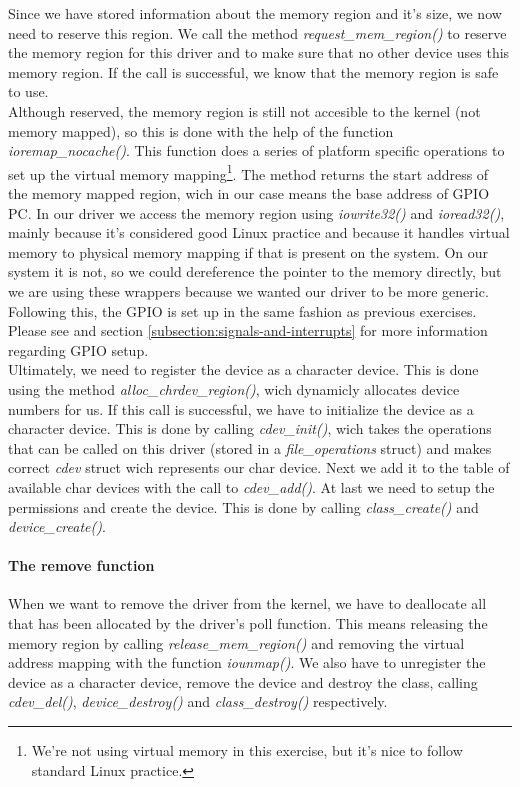 Since we have stored information about the memory region and it's size, we now need to reserve this region. We call the method \emph{request\_mem\_region()} to reserve the memory region for this driver and to make sure that no other device uses this memory region. If the call is successful, we know that the memory region is safe to use.  \\

Although reserved, the memory region is still not accesible to the kernel (not memory mapped), so this is done with the help of the function \emph{ioremap\_nocache()}. This function does a series of platform specific operations to set up the virtual memory mapping\footnote{We're not using virtual memory in this exercise, but it's nice to follow standard Linux practice.}. The method returns the start address of the memory mapped region, wich in our case means the base address of GPIO PC. In our driver we access the memory region using \emph{iowrite32()} and \emph{ioread32()}, mainly because it's considered good Linux practice and because it handles virtual memory to physical memory mapping if that is present on the system. On our system it is not, so we could dereference the pointer to the memory directly, but we are using these wrappers because we wanted our driver to be more generic. Following this, the GPIO is set up in the same fashion as previous exercises. Please see \cite[section 3]{compendium} and section \ref{subsection:signals-and-interrupts} for more information regarding GPIO setup. \\

Ultimately, we need to  register the device as a character device. This is done using the method \emph{alloc\_chrdev\_region()}, wich dynamicly allocates device numbers for us. If this call is successful, we have to initialize the device as a character device. This is done by calling \emph{cdev\_init()}, wich takes the operations that can be called on this driver (stored in a \emph{file\_operations} struct) and makes correct \emph{cdev} struct wich represents our char device. Next we add it to the table of available char devices with the call to \emph{cdev\_add()}. At last we need to setup the permissions and create the device. This is done by calling \emph{class\_create()} and \emph{device\_create()}.     


\paragraph{The remove function}
When we want to remove the driver from the kernel, we have to deallocate all that has been allocated by the driver's poll function. This means releasing the memory region by calling \emph{release\_mem\_region()} and removing the virtual address mapping with the function \emph{iounmap()}. We also have to unregister the device as a character device, remove the device and destroy the class, calling \emph{cdev\_del()}, \emph{device\_destroy()} and \emph{class\_destroy()} respectively. 

